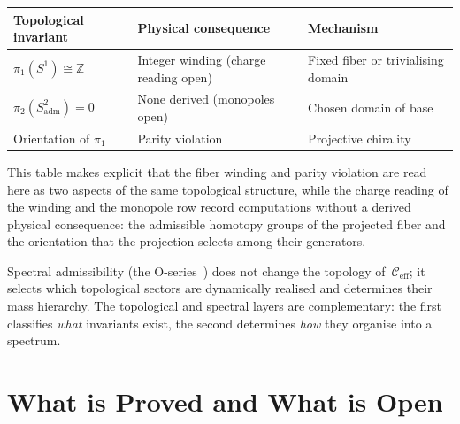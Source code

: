 \documentclass[11pt,a4paper]{article}
\newcommand{\Ceff}{\mathcal{C}_{\mathrm{eff}}}
\begin{document}
  \begin{center}
    \begin{tabular}{lll}
      \toprule
      Topological invariant & Physical consequence & Mechanism \\
      \midrule
      $\pi_1(S^1) \cong \mathbb{Z}$ &
      Integer winding (charge reading open) &
      Fixed fiber or trivialising domain \\
      $\pi_2(S^2_{\mathrm{adm}}) = 0$ &
      None derived (monopoles open) &
      Chosen domain of base \\
      Orientation of $\pi_1$ &
      Parity violation &
      Projective chirality \\
      \bottomrule
    \end{tabular}
  \end{center}

  This table makes explicit that the fiber winding and parity violation
  are read here as two aspects of the same topological structure, while the
  charge reading of the winding and the monopole row record computations
  without a derived physical consequence:
  the admissible homotopy groups of the projected fiber and the
  orientation that the projection selects among their generators.

  Spectral admissibility (the O-series~\cite{Beau2026a7,Beau2026a11})
  does not change the topology of~$\Ceff$;
  it selects which topological sectors are dynamically realised
  and determines their mass hierarchy.
  The topological and spectral layers are complementary:
  the first classifies \emph{what} invariants exist,
  the second determines \emph{how} they organise into a spectrum.

  \section{What is Proved and What is Open}
  \label{sec:status}
\end{document}

